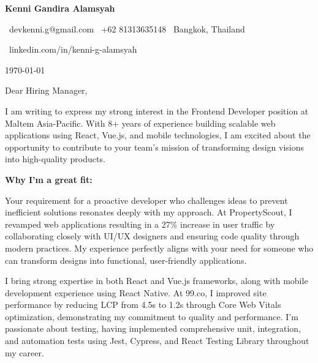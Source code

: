 \documentclass[12pt]{article}
\begin{document}
\begin{flushleft}
    {\Huge\textbf{Kenni Gandira Alamsyah}}

    \vspace{0.3cm}

    {\small
    \faEnvelope\ devkenni.g@gmail.com \quad
    \faPhone\ +62 81313635148 \quad
    \faMapMarker\ Bangkok, Thailand

    \faLinkedin\ linkedin.com/in/kenni-g-alamsyah
    }
\end{flushleft}

\vspace{0.8cm}

\today

\vspace{0.5cm}

Dear Hiring Manager,

\vspace{0.3cm}

I am writing to express my strong interest in the Frontend Developer position at Maltem Asia-Pacific. With 8+ years of experience building scalable web applications using React, Vue.js, and mobile technologies, I am excited about the opportunity to contribute to your team's mission of transforming design visions into high-quality products.

\vspace{0.3cm}

\textbf{Why I'm a great fit:}

\vspace{0.2cm}

Your requirement for a proactive developer who challenges ideas to prevent inefficient solutions resonates deeply with my approach. At PropertyScout, I revamped web applications resulting in a 27\% increase in user traffic by collaborating closely with UI/UX designers and ensuring code quality through modern practices. My experience perfectly aligns with your need for someone who can transform designs into functional, user-friendly applications.

\vspace{0.3cm}

I bring strong expertise in both React and Vue.js frameworks, along with mobile development experience using React Native. At 99.co, I improved site performance by reducing LCP from 4.5s to 1.2s through Core Web Vitals optimization, demonstrating my commitment to quality and performance. I'm passionate about testing, having implemented comprehensive unit, integration, and automation tests using Jest, Cypress, and React Testing Library throughout my career.
\end{document}
